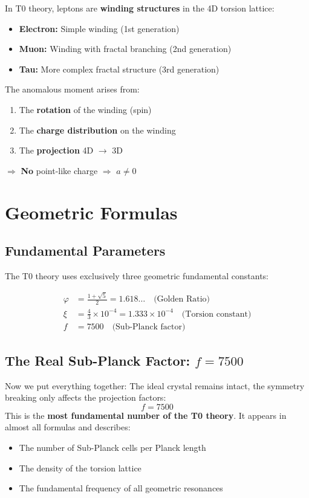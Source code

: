 	In T0 theory, leptons are \textbf{winding structures} in the 4D torsion lattice:
	
	\begin{itemize}
		\item \textbf{Electron:} Simple winding (1st generation)
		\item \textbf{Muon:} Winding with fractal branching (2nd generation)
		\item \textbf{Tau:} More complex fractal structure (3rd generation)
	\end{itemize}
	
	The anomalous moment arises from:
	\begin{enumerate}
		\item The \textbf{rotation} of the winding (spin)
		\item The \textbf{charge distribution} on the winding
		\item The \textbf{projection} 4D $\to$ 3D
	\end{enumerate}
	
	$\Rightarrow$ \textbf{No} point-like charge $\Rightarrow$ $a \neq 0$
	
	\section{Geometric Formulas}
	
	\subsection{Fundamental Parameters}
	
	The T0 theory uses exclusively three geometric fundamental constants:
	
	\begin{align}
		\varphi &= \frac{1 + \sqrt{5}}{2} = 1.618\ldots \quad \text{(Golden Ratio)} \\
		\xi &= \frac{4}{3} \times 10^{-4} = 1.333 \times 10^{-4} \quad \text{(Torsion constant)} \\
		f &= 7500 \quad \text{(Sub-Planck factor)}
	\end{align}
	
	\subsection{The Real Sub-Planck Factor: \(f = 7500\)}
	Now we put everything together: The ideal crystal remains intact, the symmetry breaking only affects the projection factors:
	\begin{equation}
		\boxed{f = 7500}
	\end{equation}
	This is the \textbf{most fundamental number of the T0 theory}. It appears in almost all formulas and describes:
	\begin{itemize}
		\item The number of Sub-Planck cells per Planck length
		\item The density of the torsion lattice
		\item The fundamental frequency of all geometric resonances
	\end{itemize}
